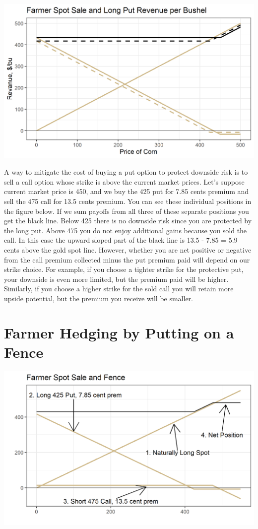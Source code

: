 \documentclass[
  letterpaper,
  DIV=11,
  numbers=noendperiod]{scrreprt}
\begin{document}
\includegraphics{assets/Options4-spotputcombzoomchoice.png}

A way to mitigate the cost of buying a put option to protect downside
risk is to sell a call option whose strike is above the current market
prices. Let's suppose current market price is 450, and we buy the 425
put for 7.85 cents premium and sell the 475 call for 13.5 cents premium.
You can see these individual positions in the figure below. If we sum
payoffs from all three of these separate positions you get the black
line. Below 425 there is no downside risk since you are protected by the
long put. Above 475 you do not enjoy additional gains because you sold
the call. In this case the upward sloped part of the black line is 13.5
- 7.85 = 5.9 cents above the gold spot line. However, whether you are
net positive or negative from the call premium collected minus the put
premium paid will depend on our strike choice. For example, if you
choose a tighter strike for the protective put, your downside is even
more limited, but the premium paid will be higher. Similarly, if you
choose a higher strike for the sold call you will retain more upside
potential, but the premium you receive will be smaller.

\hypertarget{farmer-hedging-by-putting-on-a-fence}{%
\section{Farmer Hedging by Putting on a
Fence}\label{farmer-hedging-by-putting-on-a-fence}}

\includegraphics{assets/Options4-spotfence.png}
\end{document}
